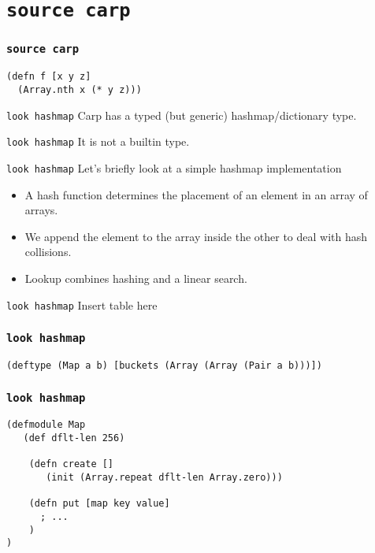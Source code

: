 \documentclass{beamer}
\begin{document}
  \section{\texttt{source carp}}
  \begin{frame}[fragile]
  \frametitle{\texttt{source carp}}
    \begin{listing}[H]
      \caption{A silly zepto function}
      \begin{verbatim}
(defn f [x y z]
  (Array.nth x (* y z)))
      \end{verbatim}
    \end{listing}
  \end{frame}
  \begin{frame}{\texttt{look hashmap}}
      Carp has a typed (but generic) hashmap/dictionary type.
  \end{frame}
  \begin{frame}{\texttt{look hashmap}}
      It is not a builtin type.
  \end{frame}
  \begin{frame}{\texttt{look hashmap}}
      Let’s briefly look at a simple hashmap implementation
      \begin{itemize}
        \item A hash function determines the placement of an element in an array of arrays.
        \item We append the element to the array inside the other to deal with hash collisions.
        \item Lookup combines hashing and a linear search.
      \end{itemize}
  \end{frame}
  \begin{frame}{\texttt{look hashmap}}
    Insert table here
  \end{frame}
  \begin{frame}[fragile]
    \frametitle{\texttt{look hashmap}}
    \begin{listing}[H]
      \caption{The hashmap type, simplified.}
      \begin{verbatim}
(deftype (Map a b) [buckets (Array (Array (Pair a b)))])
      \end{verbatim}
    \end{listing}
  \end{frame}
  \begin{frame}[fragile]
    \frametitle{\texttt{look hashmap}}
    \begin{listing}[H]
      \caption{The hashmap module, with omissions.}
      \begin{verbatim}
(defmodule Map
   (def dflt-len 256)

    (defn create []
       (init (Array.repeat dflt-len Array.zero)))

    (defn put [map key value]
      ; ...
    )
)
      \end{verbatim}
    \end{listing}
  \end{frame}
\end{document}
